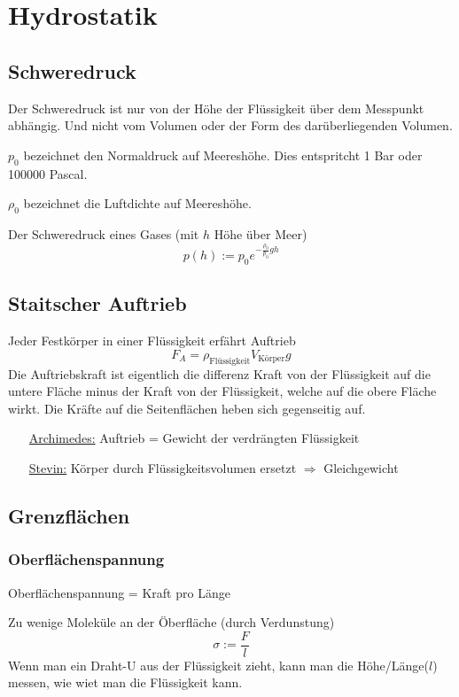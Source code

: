 \section{Hydrostatik}

\subsection{Schweredruck}
Der Schweredruck ist nur von der Höhe der Flüssigkeit über dem Messpunkt abhängig.
Und nicht vom Volumen oder der Form des darüberliegenden Volumen.

$p_0$ bezeichnet den Normaldruck auf Meereshöhe. Dies entspritcht 1 Bar oder 100000 Pascal.

$\rho_0$ bezeichnet die Luftdichte auf Meereshöhe.

Der Schweredruck eines Gases (mit $h$ Höhe über Meer) 
\[
    p(h) := p_0 e^{-\frac{\rho_0}{p_0}gh}
\]

\subsection{Staitscher Auftrieb}
Jeder Festkörper in einer Flüssigkeit erfährt Auftrieb
\[
    F_A=\rho_\text{Flüssigkeit}V_\text{Körper}g
\]
Die Auftriebskraft ist eigentlich die differenz Kraft von der Flüssigkeit auf die untere
Fläche minus der Kraft von der Flüssigkeit, welche auf die obere Fläche wirkt.
Die Kräfte auf die Seitenflächen heben sich gegenseitig auf.
\begin{itemize}
\item[\underline{Archimedes:}] Auftrieb = Gewicht der verdrängten Flüssigkeit
\item[\underline{Stevin:}] Körper durch Flüssigkeitsvolumen ersetzt $\Rightarrow$ Gleichgewicht
\end{itemize}



\subsection{Grenzflächen}

\subsubsection{Oberflächenspannung}
Oberflächenspannung = Kraft pro Länge

Zu wenige Moleküle an der Öberfläche (durch Verdunstung)
\[
    \sigma:=\frac{F}{l}
\]
Wenn man ein Draht-U aus der Flüssigkeit zieht, kann man die Höhe/Länge($l$) messen, wie wiet man die Flüssigkeit
 kann.

